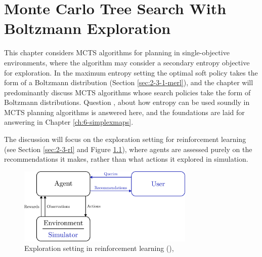 

\chapter{\label{ch:4-dents}Monte Carlo Tree Search With Boltzmann Exploration} 

    \minitoc

    This chapter considers MCTS algorithms for planning in single-objective environments, where the algorithm may consider a secondary entropy objective for exploration. In the maximum entropy setting the optimal soft policy takes the form of a Boltzmann distribution (Section \ref{sec:2-3-1-merl}), and the chapter will predominantly discuss MCTS algorithms whose search policies take the form of Boltzmann distributions. Question \entropyq, about how entropy can be used soundly in MCTS planning algorithms is answered here, and the foundations are laid for answering \contextq\ewe in Chapter \ref{ch:6-simplexmaps}.
    
    The discussion will focus on the exploration setting for reinforcement learning (see Section \ref{sec:2-3-rl} and Figure \ref{fig:4:rl_overview}), where agents are assessed purely on the recommendations it makes, rather than what actions it explored in simulation.
    
    \begin{figure}
        \centering\includegraphics[width=0.75\textwidth]{figures/ch2/rl_overview.pdf} 
        \caption[Exploration setting in reinforcement learning.]{ Exploration setting in reinforcement learning (),  }
        \label{fig:4:rl_overview}
    \end{figure}
    
